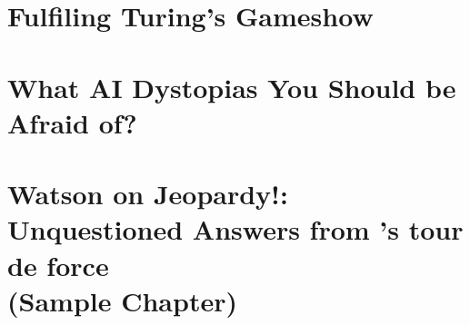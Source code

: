 \documentclass[bfivepaper,twosided,justified,nobib]{style/tufte-book}
\newif\ifproposal\proposaltrue
\newcommand{\proposalpart}[2]{
  \ifproposal
  \else
  \part{#1}
  \fi
}
\newcommand{\chapterfile}[3]{
  \ifproposal
      \begingroup
      \renewcommand{\cleardoublepage}{}
      \renewcommand{\clearpage}{}
      \chapter{#3}\label{chap:#2}
      \endgroup
      \vspace{-0.5cm}
      
      \vspace{-2.5cm}
  \else
      \chapter{#3}
      \label{ch:#2}
      \begin{quote}
        
      \end{quote} 
      
  \fi}
\begin{document}






\proposalpart{Question Answering Future}{3}

\chapterfile{300}{gameshow}{Fulfiling Turing's Gameshow}

\chapterfile{310}{scifi}{What AI Dystopias You Should be Afraid of?}






\ifproposal

\titleformat{\chapter}[display]
{\normalfont%
    \huge%
    \bfseries}{\chaptertitlename\ \thechapter}{20pt}{%
    \Huge %
    }
  \setcounter{chapter}{5}
  \chapter{Watson on Jeopardy!: \\ Unquestioned Answers from 's tour
    de force \\ (Sample Chapter)}
  
  \begin{quote}
    
  \end{quote}
  
  
\fi

\backmatter





\printindex
\end{document}
